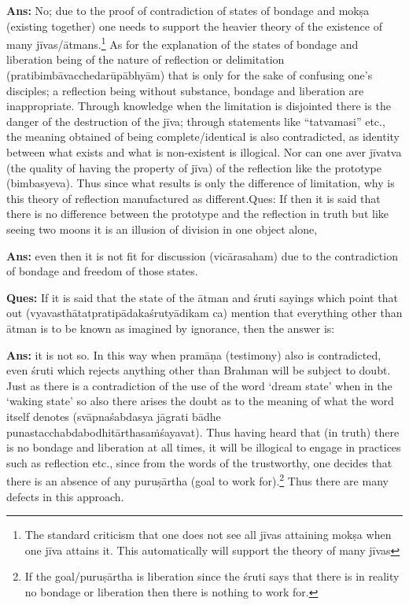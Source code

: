 \textbf{Ans:} No; due to the proof of contradiction of states of bondage and mokṣa (existing together) one needs to support the  heavier theory of the existence of many jīvas/ātmans.\footnote{The standard criticism that one does not see all jīvas attaining mokṣa when one jīva attains it. This automatically will support the theory of many jīvas} As for the explanation of the states of bondage and liberation being of the nature of reflection or delimitation (pratibimbāvacchedarūpābhyām) that is only for the sake of confusing one’s disciples; a reflection being without substance, bondage and liberation are inappropriate.  Through knowledge when the limitation is disjointed there is the danger of the destruction of the jīva; through statements like “tatvamasi” etc., the meaning obtained of being complete/identical is also contradicted, as identity between what exists and what is non-existent is illogical. Nor can one aver jīvatva (the quality of having the property of jīva) of the reflection like the prototype (bimbasyeva). Thus since what results is only the difference of limitation, why is this theory of reflection manufactured as different.Ques: If then it is said that there is no difference between the prototype and the reflection in truth but like seeing two moons it is an illusion of division in one object alone, 

\textbf{Ans:} even then it is not fit for discussion (vicārasaham) due to the contradiction of bondage and freedom of those states.

\textbf{Ques:} If it is said that the state of the ātman and śruti sayings which point that out (vyavasthātatpratipādakaśrutyādikam ca) mention that everything other than ātman is to be known as imagined by ignorance, then the answer is:

\textbf{Ans:} it is not so. In this way when pramāṇa (testimony) also is contradicted, even śruti which rejects anything other than Brahman will be subject to doubt. Just as there is a contradiction of the use of the word ‘dream state’ when in the ‘waking state’ so also there arises the doubt as to  the meaning of what the word itself denotes (svāpnaśabdasya jāgrati bādhe punastacchabdabodhitārthasaṁśayavat). Thus having heard that (in truth) there is no bondage and liberation at all times, it will be illogical to engage in practices such as reflection etc., since from the words of the trustworthy, one decides that there is an absence of any puruṣārtha (goal to work for).\footnote{If the goal/puruṣārtha is liberation since the śruti says that there is in reality no bondage or liberation then there is nothing to work for.} Thus there are many defects in this approach.


